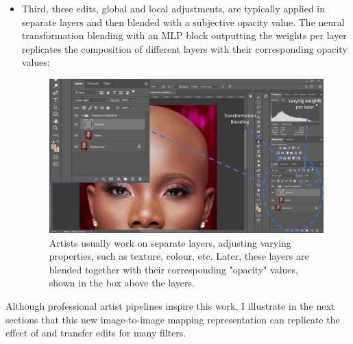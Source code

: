 \begin{itemize}
\begin{figure}[ht]
\label{fig:PS-brush}
\end{figure}

\item Third, these edits, global and local adjustments, are typically applied in separate layers and then blended with a subjective opacity value. The neural transformation blending with an MLP block outputting the weights per layer replicates the composition of different layers with their corresponding opacity values:

\begin{figure}[ht]
\centering
\includegraphics[width=0.75\columnwidth]{Chapters/detail-retouching-figs/PS2.pdf}
    \caption{Artists usually work on separate layers, adjusting varying properties, such as texture, colour, etc. Later, these layers are blended together with their corresponding "opacity" values, shown in the box above the layers.}

\label{fig:PS-all-together}
\end{figure}

\end{itemize}
Although professional artist pipelines inspire this work, I illustrate in the next sections that this new image-to-image mapping representation can replicate the effect of and transfer edits for many filters.
